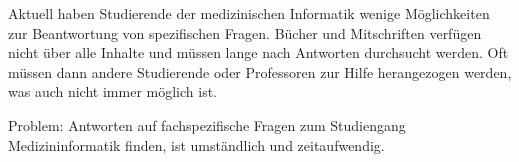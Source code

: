 Aktuell haben Studierende der medizinischen Informatik wenige Möglichkeiten zur Beantwortung von spezifischen Fragen.
Bücher und Mitschriften verfügen nicht über alle Inhalte und müssen lange nach Antworten durchsucht werden.
Oft müssen dann andere Studierende oder Professoren zur Hilfe herangezogen werden, was auch nicht immer möglich ist.

Problem: Antworten auf fachspezifische Fragen zum Studiengang Medizininformatik finden, ist umständlich und zeitaufwendig.


